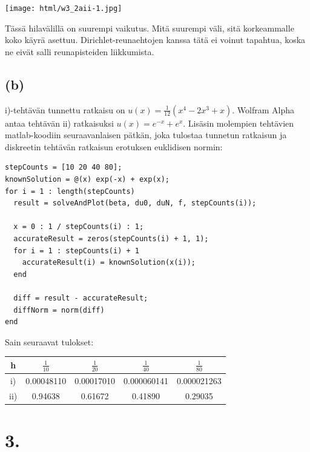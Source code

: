 \documentclass{article}
\begin{document}
\begin{center}
\texttt{[image: html/w3\_2aii-1.jpg]}
\end{center}

Tässä hilavälillä on suurempi vaikutus. Mitä suurempi väli, sitä korkeammalle
koko käyrä asettuu. Dirichlet-reunaehtojen kanssa tätä ei voinut tapahtua,
koska ne eivät salli reunapisteiden liikkumista.

\subsection*{(b)}

i)-tehtävän tunnettu ratkaisu on $u(x) = \frac{1}{12}(x^4 - 2x^3 + x)$.
Wolfram Alpha antaa tehtävän ii) ratkaisuksi $u(x) = e^{-x} + e^x$. Lisäsin
molempien tehtävien matlab-koodiin seuraavanlaisen pätkän, joka tulostaa
tunnetun ratkaisun ja diskreetin tehtävän ratkaisun erotuksen euklidisen
normin:

\begin{verbatim}
stepCounts = [10 20 40 80];
knownSolution = @(x) exp(-x) + exp(x);
for i = 1 : length(stepCounts)
  result = solveAndPlot(beta, du0, duN, f, stepCounts(i));

  x = 0 : 1 / stepCounts(i) : 1;
  accurateResult = zeros(stepCounts(i) + 1, 1);
  for i = 1 : stepCounts(i) + 1
    accurateResult(i) = knownSolution(x(i));
  end

  diff = result - accurateResult;
  diffNorm = norm(diff)
end
\end{verbatim}

Sain seuraavat tulokset:

\begin{center}
  \begin{tabular}{|c|c|c|c|c|}
    \hline
    h & $\frac{1}{10}$ & $\frac{1}{20}$ & $\frac{1}{40}$ & $\frac{1}{80}$ \\
    \hline\hline
    i) & 0.00048110 & 0.00017010 & 0.000060141 & 0.000021263 \\
    \hline
    ii) & 0.94638 & 0.61672 & 0.41890 & 0.29035 \\
    \hline
  \end{tabular}
\end{center}

\newpage

\section*{3.}
\end{document}
